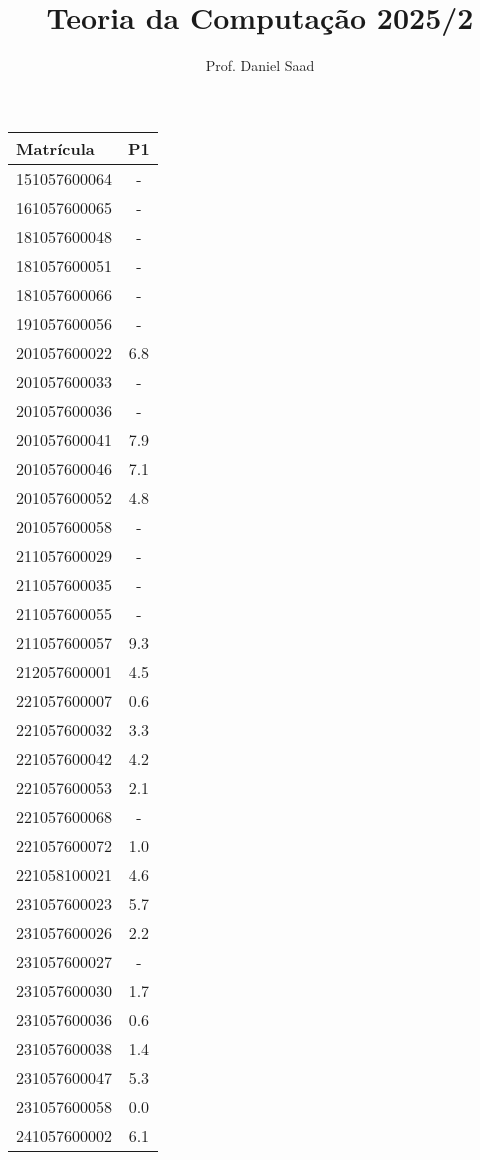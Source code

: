 \documentclass{article}
\title{ Teoria da Computação 2025/2}
\date{}
\author{ Prof. Daniel Saad}
\begin{document}
 \maketitle
    \begin{longtable}{|l|c|}
    \hline
Matrícula & P1\\\hline \endhead   
151057600064 & -\\\hline
161057600065 & -\\\hline
181057600048 & -\\\hline
181057600051 & -\\\hline
181057600066 & -\\\hline
191057600056 & -\\\hline
201057600022 & 6.8\\\hline
201057600033 & -\\\hline
201057600036 & -\\\hline
201057600041 & 7.9\\\hline
201057600046 & 7.1\\\hline
201057600052 & 4.8\\\hline
201057600058 & -\\\hline
211057600029 & -\\\hline
211057600035 & -\\\hline
211057600055 & -\\\hline
211057600057 & 9.3\\\hline
212057600001 & 4.5\\\hline
221057600007 & 0.6\\\hline
221057600032 & 3.3\\\hline
221057600042 & 4.2\\\hline
221057600053 & 2.1\\\hline
221057600068 & -\\\hline
221057600072 & 1.0\\\hline
221058100021 & 4.6\\\hline
231057600023 & 5.7\\\hline
231057600026 & 2.2\\\hline
231057600027 & -\\\hline
231057600030 & 1.7\\\hline
231057600036 & 0.6\\\hline
231057600038 & 1.4\\\hline
231057600047 & 5.3\\\hline
231057600058 & 0.0\\\hline
241057600002 & 6.1\\\hline

\end{longtable}
\end{document}
